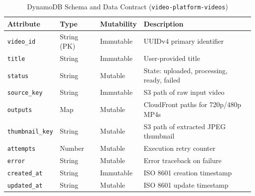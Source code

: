 \documentclass[conference]{IEEEtran}
\begin{document}
\begin{table}[htbp]
\caption{DynamoDB Schema and Data Contract (\texttt{video-platform-videos})}
\label{tab:dynamodb}
\begin{center}
\begin{tabular}{llll}
\toprule
\textbf{Attribute} & \textbf{Type} & \textbf{Mutability} & \textbf{Description} \\
\midrule
\texttt{video\_id} & String (PK) & Immutable & UUIDv4 primary identifier \\
\texttt{title} & String & Immutable & User-provided title \\
\texttt{status} & String & Mutable & State: uploaded, processing, ready, failed \\
\texttt{source\_key} & String & Immutable & S3 path of raw input video \\
\texttt{outputs} & Map & Mutable & CloudFront paths for 720p/480p MP4s \\
\texttt{thumbnail\_key} & String & Mutable & S3 path of extracted JPEG thumbnail \\
\texttt{attempts} & Number & Mutable & Execution retry counter \\
\texttt{error} & String & Mutable & Error traceback on failure \\
\texttt{created\_at} & String & Immutable & ISO 8601 creation timestamp \\
\texttt{updated\_at} & String & Mutable & ISO 8601 update timestamp \\
\bottomrule
\end{tabular}
\end{center}
\end{table}
\end{document}
